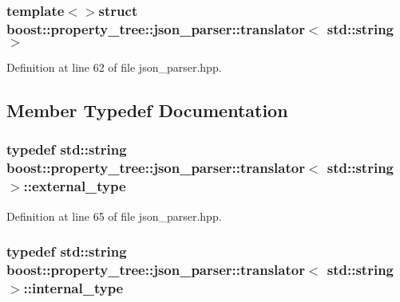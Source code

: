 \subsubsection*{template$<$$>$struct boost\-::property\-\_\-tree\-::json\-\_\-parser\-::translator$<$ std\-::string $>$}



Definition at line 62 of file json\-\_\-parser.\-hpp.



\subsection{Member Typedef Documentation}
\hypertarget{structboost_1_1property__tree_1_1json__parser_1_1translator_3_01std_1_1string_01_4_a31b953272d7ddc4de96930a64e01c25a}{
\subsubsection[{external\-\_\-type}]{\setlength{\rightskip}{0pt plus 5cm}typedef std\-::string {\bf boost\-::property\-\_\-tree\-::json\-\_\-parser\-::translator}$<$ std\-::string $>$\-::{\bf external\-\_\-type}}}\label{structboost_1_1property__tree_1_1json__parser_1_1translator_3_01std_1_1string_01_4_a31b953272d7ddc4de96930a64e01c25a}


Definition at line 65 of file json\-\_\-parser.\-hpp.

\hypertarget{structboost_1_1property__tree_1_1json__parser_1_1translator_3_01std_1_1string_01_4_a0442088549debbf3d26b2506b4bd7aad}{
\subsubsection[{internal\-\_\-type}]{\setlength{\rightskip}{0pt plus 5cm}typedef std\-::string {\bf boost\-::property\-\_\-tree\-::json\-\_\-parser\-::translator}$<$ std\-::string $>$\-::{\bf internal\-\_\-type}}}\label{structboost_1_1property__tree_1_1json__parser_1_1translator_3_01std_1_1string_01_4_a0442088549debbf3d26b2506b4bd7aad}


